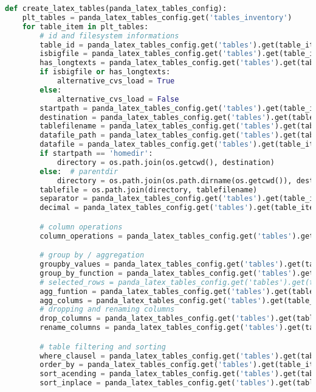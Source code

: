 \begin{lstlisting}[language=python, caption=pandas_dataframe_to_latex_table.py CSV - LaTex Tabelle,captionpos=b,label={lst:Python LaTex - pandas_dataframe_to_latex_table},breaklines=true]
def create_latex_tables(panda_latex_tables_config):
    plt_tables = panda_latex_tables_config.get('tables_inventory')
    for table_item in plt_tables:
        # id and filesystem informations
        table_id = panda_latex_tables_config.get('tables').get(table_item).get('id')
        isbigfile = panda_latex_tables_config.get('tables').get(table_item).get('isbigfile')
        has_longtexts = panda_latex_tables_config.get('tables').get(table_item).get('has_longtexts')
        if isbigfile or has_longtexts:
            alternative_cvs_load = True
        else:
            alternative_cvs_load = False
        startpath = panda_latex_tables_config.get('tables').get(table_item).get('startpath')
        destination = panda_latex_tables_config.get('tables').get(table_item).get('destination_path')
        tablefilename = panda_latex_tables_config.get('tables').get(table_item).get('tablefilename')
        datafile_path = panda_latex_tables_config.get('tables').get(table_item).get('datafile_path')
        datafile = panda_latex_tables_config.get('tables').get(table_item).get('datafile')
        if startpath == 'homedir':
            directory = os.path.join(os.getcwd(), destination)
        else:  # parentdir
            directory = os.path.join(os.path.dirname(os.getcwd()), destination)
        tablefile = os.path.join(directory, tablefilename)
        separator = panda_latex_tables_config.get('tables').get(table_item).get('separator')
        decimal = panda_latex_tables_config.get('tables').get(table_item).get('decimal')

        # column operations
        column_operations = panda_latex_tables_config.get('tables').get(table_item).get('column_operations').get('datas')

        # group by / aggregation
        groupby_values = panda_latex_tables_config.get('tables').get(table_item).get('group_by')
        group_by_function = panda_latex_tables_config.get('tables').get(table_item).get('group_by_function')
        # selected_rows = panda_latex_tables_config.get('tables').get(table_item).get('selected_rows')
        agg_funtion = panda_latex_tables_config.get('tables').get(table_item).get('agg_funtion')
        agg_colums = panda_latex_tables_config.get('tables').get(table_item).get('agg_colums')
        # dropping and renaming columns
        drop_columns = panda_latex_tables_config.get('tables').get(table_item).get('drop_columns')
        rename_columns = panda_latex_tables_config.get('tables').get(table_item).get('rename_columns')

        # table filtering and sorting
        where_clausel = panda_latex_tables_config.get('tables').get(table_item).get('where_clausel')
        order_by = panda_latex_tables_config.get('tables').get(table_item).get('sorting').get('order_by')
        sort_acending = panda_latex_tables_config.get('tables').get(table_item).get('sorting').get('sort_acending')
        sort_inplace = panda_latex_tables_config.get('tables').get(table_item).get('sorting').get('sort_inplace')


\end{lstlisting}
